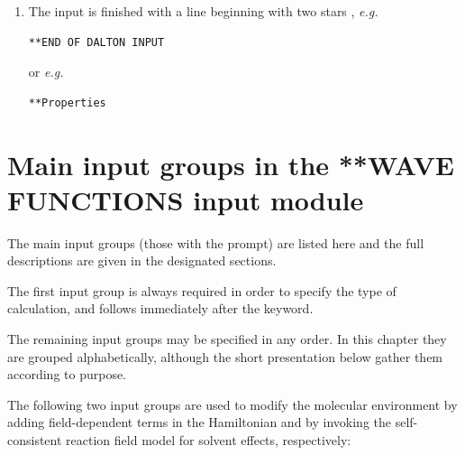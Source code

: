 \begin{enumerate}
{\begin{inputex} \begin{verbatim}
**Wave functions
*Orbital input
.options
**End of Dalton input
\end{verbatim} \end{inputex}

   will cause a dump of all keywords in the  input group
   in {\sir} (this is also an example of using mixed case for the keywords).
}

\item{ The {\sir} input is finished with a line beginning with two stars {\starstarkey},
   {\it e.g.}

\begin{inputex} \begin{verbatim}
**END OF DALTON INPUT
\end{verbatim} \end{inputex}
   or {\it e.g.}

\begin{inputex} \begin{verbatim}
**Properties
\end{verbatim} \end{inputex}

}
\end{enumerate}

\pagebreak[3]
\section{\label{sec:ref-newinp}
   Main input groups in the **WAVE FUNCTIONS input module}

\noindent
The main input groups (those with the {\starkey} prompt) are listed here and
the full descriptions are given in the designated sections.

\noindent
The first input group is always required in order to specify the type of
calculation, and follows immediately after the 
keyword.


\noindent The remaining input groups may be specified in any
order. In this chapter they are grouped alphabetically, although
the short presentation below gather them according to purpose.

The following two input groups are used to modify the
molecular environment by adding field-dependent
terms in the Hamiltonian and by invoking
the self-consistent reaction field model for solvent
effects, respectively:

